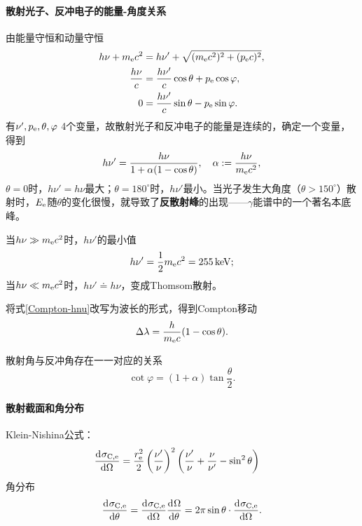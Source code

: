 \paragraph{散射光子、反冲电子的能量-角度关系}由能量守恒和动量守恒
\begin{align*}
	h\nu+m_\mathrm e c^2&=h\nu'+\sqrt{(m_\mathrm e c^2)^2+(p_\mathrm e c)^2},\\
	\frac{h\nu}c&=\frac{h\nu'}c\cos\theta+p_\mathrm e\cos\varphi,\\
	0&=\frac{h\nu'}c\sin\theta-p_\mathrm e\sin\varphi.
\end{align*}
有$\nu',p_\mathrm e,\theta,\varphi$ 4个变量，故散射光子和反冲电子的能量是连续的，确定一个变量，得到
\begin{align}\label{Compton-hnu}
	h\nu'=\frac{h\nu}{1+\alpha(1-\cos\theta)},\quad \alpha:=\frac{h\nu}{m_\mathrm e c^2},
\end{align}
$\theta=0$时，$h\nu'=h\nu$最大；$\theta=180^\circ$时，$h\nu'$最小。当光子发生大角度（$\theta>150^\circ$）散射时，$E_\mathrm e$随$\theta$的变化很慢，就导致了\textbf{反散射峰}的出现——$\gamma$能谱中的一个著名本底峰。

当$h\nu\gg m_\mathrm e c^2$时，$h\nu'$的最小值
\[
	h\nu'=\frac12m_\mathrm e c^2=\SI{255}{keV};
\]
当$h\nu\ll m_\mathrm e c^2$时，$h\nu'\doteq h\nu$，变成Thomsom散射。

将式\eqref{Compton-hnu}改写为波长的形式，得到Compton移动
\begin{align}
	\Delta\lambda=\frac h{m_\mathrm e c}(1-\cos\theta).
\end{align}

散射角与反冲角存在一一对应的关系
\[
	\cot\varphi=(1+\alpha)\tan\frac\theta{2}.
\]

\paragraph{散射截面和角分布}
Klein-Nishina公式：
\begin{align*}
	\frac{\mathrm{d}^{{}}\sigma_{\mathrm C,\mathrm e}}{\mathrm{d}{\Omega}^{{}}}&=\frac{r_\mathrm e^2}2\left(\frac{\nu'}\nu\right)^2\left(\frac{\nu'}\nu+\frac\nu{\nu'}-\sin^2\theta\right)
\end{align*}
角分布
\[
	\frac{\mathrm{d}^{{}}\sigma_{\mathrm C,\mathrm e}}{\mathrm{d}{\theta}^{{}}}=\frac{\mathrm{d}^{{}}\sigma_{\mathrm C,\mathrm e}}{\mathrm{d}{\Omega}^{{}}}\frac{\mathrm{d}^{{}}\Omega}{\mathrm{d}{\theta}^{{}}}=2\pi\sin\theta\cdot\frac{\mathrm{d}^{{}}\sigma_{\mathrm C,\mathrm e}}{\mathrm{d}{\Omega}^{{}}}.
\]
